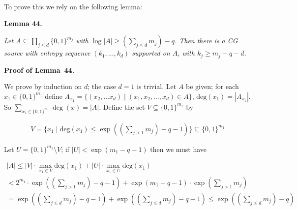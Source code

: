 To prove this we rely on the following lemma:\par





\par\medskip\noindent\textbf{
\textbf{Lemma 44}\textbf{.}
}\par



\emph{Let $A\subseteq\prod_{j\leq d}\{0,1\}^{m_{j}}$ with $\log|A|\geq(\sum_{j\leq d}m_{j})-q$. Then there is a CG source with entropy sequence $(k_{1},\ldots,k_{d})$ supported on $A$, with $k_{j}\geq m_{j}-q-d$.}\par







\par\medskip\noindent\textbf{Proof of Lemma 44.}\par




We prove by induction on $d$; the case $d=1$ is trivial. Let $A$ be given; for each $x_{1}\in\{0,1\}^{m_{1}}$ define $A_{x_{1}}=\{(x_{2},\ldots x_{d})\mid(x_{1},x_{2},\ldots,x_{d})\in A\}$, $\mathrm{deg}(x_{1})=|A_{x_{1}}|$. So $\sum_{x_{1}\in\{0,1\}^{m_{1}}}\deg(x)=|A|.$
Define the set $V\subseteq\{0,1\}^{m_{1}}$ by\par


\[\begin{gathered}
V=\{x_{1}\mid\mathrm{deg}(x_{1})\leq\exp((\sum_{j>1}m_{j})-q-1)\}\subseteq\{0,1\}^{m_{1}}
\end{gathered}\]


Let $U=\{0,1\}^{m_{1}}\setminus V$; if $|U|<\exp(m_{1}-q-1)$ then we must have\par




\[\begin{gathered}
\displaystyle|A|\leq|V|\cdot\max_{x_{1}\in V}\mathrm{deg}(x_{1})+|U|\cdot\max_{x_{1}\in U}\mathrm{deg}(x_{1}) \\
\displaystyle<2^{m_{1}}\cdot\exp((\sum_{j>1}m_{j})-q-1)+\exp(m_{1}-q-1)\cdot\exp(\sum_{j>1}m_{j}) \\
\displaystyle=\exp((\sum_{j\leq d}m_{j})-q-1)+\exp((\sum_{j\leq d}m_{j})-q-1)\leq\exp((\sum_{j\leq d}m_{j})-q)
\end{gathered}\]


